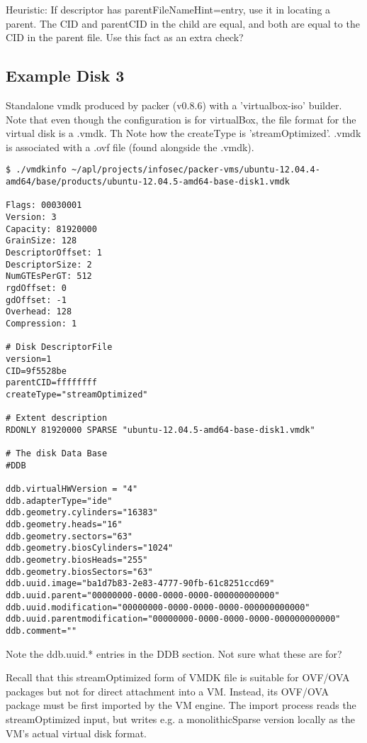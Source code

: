 \documentclass{article}
\begin{document}
Heuristic: If descriptor has parentFileNameHint=entry, use it in locating
a parent.  The CID and parentCID in the child are equal, and both are
equal to the CID in the parent file.  Use this fact as an extra check?

\subsection{Example Disk 3}

Standalone vmdk produced by packer (v0.8.6) with a 'virtualbox-iso'
builder.  Note that even though the configuration is for virtualBox,
the file format for the virtual disk is a .vmdk.  Th
Note how the createType is 'streamOptimized'.  .vmdk is associated
with a .ovf file (found alongside the .vmdk).

\begin{verbatim}
$ ./vmdkinfo ~/apl/projects/infosec/packer-vms/ubuntu-12.04.4-amd64/base/products/ubuntu-12.04.5-amd64-base-disk1.vmdk 

Flags: 00030001
Version: 3
Capacity: 81920000
GrainSize: 128
DescriptorOffset: 1
DescriptorSize: 2
NumGTEsPerGT: 512
rgdOffset: 0
gdOffset: -1
Overhead: 128
Compression: 1

# Disk DescriptorFile
version=1
CID=9f5528be
parentCID=ffffffff
createType="streamOptimized"

# Extent description
RDONLY 81920000 SPARSE "ubuntu-12.04.5-amd64-base-disk1.vmdk"

# The disk Data Base 
#DDB

ddb.virtualHWVersion = "4"
ddb.adapterType="ide"
ddb.geometry.cylinders="16383"
ddb.geometry.heads="16"
ddb.geometry.sectors="63"
ddb.geometry.biosCylinders="1024"
ddb.geometry.biosHeads="255"
ddb.geometry.biosSectors="63"
ddb.uuid.image="ba1d7b83-2e83-4777-90fb-61c8251ccd69"
ddb.uuid.parent="00000000-0000-0000-0000-000000000000"
ddb.uuid.modification="00000000-0000-0000-0000-000000000000"
ddb.uuid.parentmodification="00000000-0000-0000-0000-000000000000"
ddb.comment=""
\end{verbatim}

Note the ddb.uuid.* entries in the DDB section.  Not sure what these
are for?

Recall that this streamOptimized form of VMDK file is suitable for
OVF/OVA packages but not for direct attachment into a VM.  Instead,
its OVF/OVA package must be first imported by the VM engine.  The
import process reads the streamOptimized input, but writes e.g. a
monolithicSparse version locally as the VM's actual virtual disk
format.
\end{document}
